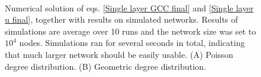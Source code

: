 \documentclass[
11pt, %
english, %
singlespacing, %
liststotoc, %
headsepline, %
]{MastersDoctoralThesis} %
\begin{document}

\begin{figure}
	\caption{}
\end{figure}

{
\begin{figure}
	\\
	\caption{Numerical solution of eqs. \eqref{Single layer GCC final} and \eqref{Single layer u final}, together with results on simulated networks. Results of simulations are average over 10 runs and the network size was set to $10^4$ nodes. Simulations ran for several seconds in total, indicating that much larger network should be easily usable. (A) Poisson degree distribution. (B) Geometric degree distribution.}
\end{figure}
}
\end{document}
